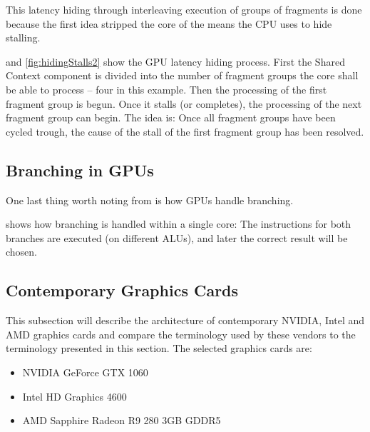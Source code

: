 This latency hiding through interleaving execution of groups of fragments is done because the first idea  stripped the core of the means the \gls{CPU} uses to hide stalling. 



 and \cref{fig:hidingStalls2} show the \gls{GPU} latency hiding process.
First the Shared Context component is divided into the number of fragment groups the core shall be able to process -- four in this example.
Then the processing of the first fragment group is begun. 
Once it stalls (or completes), the processing of the next fragment group can begin.
The idea is: Once all fragment groups have been cycled trough, the cause of the stall of the first fragment group has been resolved.

\subsection{Branching in \glspl{GPU}}
One last thing worth noting from \cite{intro_to_gpu_arch} is how \glspl{GPU} handle branching.


 shows how branching is handled within a single core: The instructions for both branches are executed (on different \glspl{ALU}), and later the correct result will be chosen.

\subsection{Contemporary Graphics Cards} 
This subsection will describe the architecture of  contemporary NVIDIA, Intel and AMD graphics cards and compare the terminology used by these vendors to the terminology presented in this section.
The selected graphics cards are:
\begin{itemize}
	\item NVIDIA GeForce GTX 1060
	\item Intel HD Graphics 4600
	\item AMD Sapphire Radeon R9 280 3GB GDDR5
\end{itemize}


